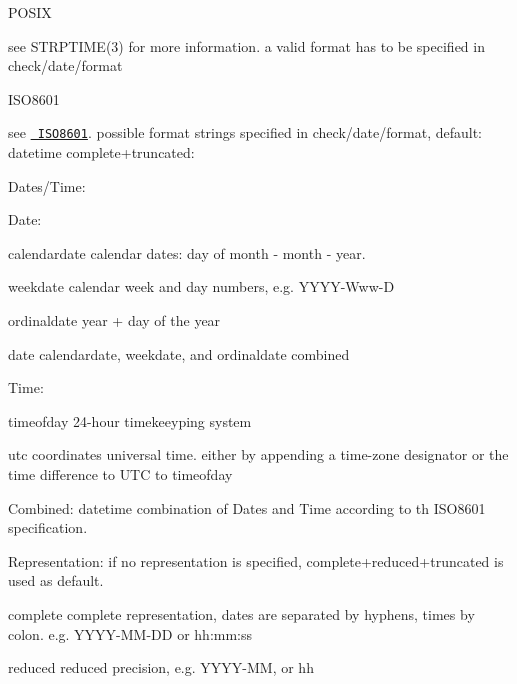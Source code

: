 \begin{DoxyItemize}
\item {\ttfamily P\+O\+S\+IX}

see {\ttfamily S\+T\+R\+P\+T\+I\+M\+E(3)} for more information. a valid format has to be specified in {\ttfamily check/date/format}
\item {\ttfamily I\+S\+O8601}

see \href{https://en.wikipedia.org/wiki/ISO_8601}{\texttt{ I\+S\+O8601}}. possible format strings specified in {\ttfamily check/date/format}, default\+: {\ttfamily datetime complete+truncated}\+:
\begin{DoxyItemize}
\item Dates/\+Time\+:
\begin{DoxyItemize}
\item Date\+:
\begin{DoxyItemize}
\item {\ttfamily calendardate} calendar dates\+: day of month -\/ month -\/ year.
\item {\ttfamily weekdate} calendar week and day numbers, e.\+g. Y\+Y\+Y\+Y-\/\+Www-\/D
\item {\ttfamily ordinaldate} year + day of the year
\item {\ttfamily date} {\ttfamily calendardate}, {\ttfamily weekdate}, and {\ttfamily ordinaldate} combined
\end{DoxyItemize}
\item Time\+:
\begin{DoxyItemize}
\item {\ttfamily timeofday} 24-\/hour timekeeyping system
\item {\ttfamily utc} coordinates universal time. either by appending a time-\/zone designator or the time difference to {\ttfamily U\+TC} to {\ttfamily timeofday}
\end{DoxyItemize}
\item Combined\+: {\ttfamily datetime} combination of Dates and Time according to th I\+S\+O8601 specification.
\end{DoxyItemize}
\item Representation\+: if no representation is specified, {\ttfamily complete+reduced+truncated} is used as default.
\begin{DoxyItemize}
\item {\ttfamily complete} complete representation, dates are separated by hyphens, times by colon. e.\+g. Y\+Y\+Y\+Y-\/\+M\+M-\/\+DD or hh\+:mm\+:ss
\item {\ttfamily reduced} reduced precision, e.\+g. Y\+Y\+Y\+Y-\/\+MM, or hh

\end{DoxyItemize}
\end{DoxyItemize}
\end{DoxyItemize}
